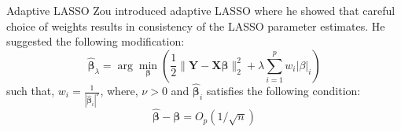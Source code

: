 \documentclass[tikz]{beamer}					%
\newcommand{\bbeta}{\bm{\beta}}
\newcommand{\hb}{\hat{\bbeta}}
\begin{document}
{
\begin{frame}{Adaptive LASSO}
Zou introduced adaptive LASSO where he showed that careful choice of weights
results in consistency of the LASSO parameter estimates. He suggested the following
modification:
\begin{equation}
    \hb_{\lambda} = \arg\min_{\bbeta} \left(\frac{1}{2}\|\bm{Y}-\bm{X}\bbeta\|_2^2 +\lambda \sum_{i=1}^{p}w_i|\beta|_i \right)
\end{equation}
such that, $w_i = \frac{1}{|\hb_i|^{\nu}}$, where, $\nu>0$ and $\hb_i$ 
satisfies the following condition:
\begin{equation}
    \hb - \bbeta = O_p(1/\sqrt{n})
\end{equation}

\end{frame}
}
\end{document}
